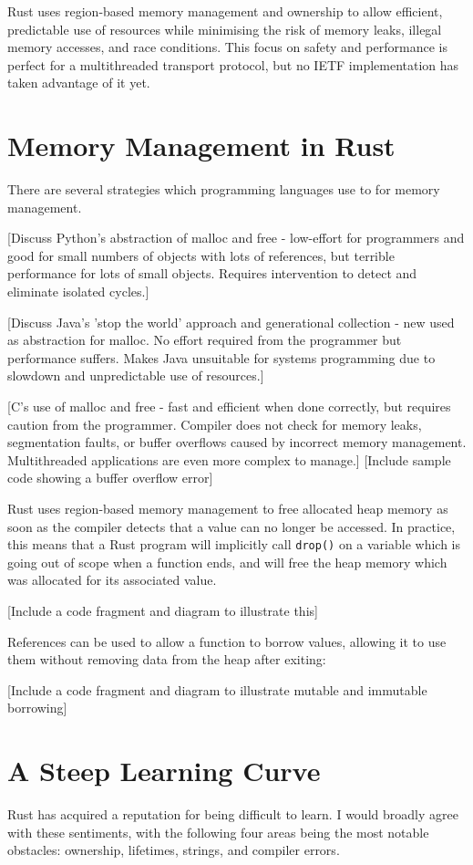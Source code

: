 \documentclass{l4proj}
\begin{document}
Rust uses region-based memory management and ownership to allow efficient, predictable use of resources while minimising the risk of memory leaks, illegal memory accesses, and race conditions. This focus on safety and performance is perfect for a multithreaded transport protocol, but no IETF implementation has taken advantage of it yet.

\section{Memory Management in Rust}
There are several strategies which programming languages use to for memory management.

[Discuss Python's abstraction of malloc and free - low-effort for programmers and good for small numbers of objects with lots of references, but terrible performance for lots of small objects. Requires intervention to detect and eliminate isolated cycles.]

[Discuss Java's 'stop the world' approach and generational collection - new used as abstraction for malloc. No effort required from the programmer but performance suffers. Makes Java unsuitable for systems programming due to slowdown and unpredictable use of resources.]

[C's use of malloc and free - fast and efficient when done correctly, but requires caution from the programmer. Compiler does not check for memory leaks, segmentation faults, or buffer overflows caused by incorrect memory management. Multithreaded applications are even more complex to manage.]
[Include sample code showing a buffer overflow error]

Rust uses region-based memory management to free allocated heap memory as soon as the compiler detects that a value can no longer be accessed. In practice, this means that a Rust program will implicitly call \texttt{drop()} on a variable which is going out of scope when a function ends, and will free the heap memory which was allocated for its associated value.

[Include a code fragment and diagram to illustrate this]

References can be used to allow a function to borrow values, allowing it to use them without removing data from the heap after exiting:

[Include a code fragment and diagram to illustrate mutable and immutable borrowing]


\section{A Steep Learning Curve}
Rust has acquired a reputation for being difficult to learn.\cite{rust-difficulty2}\cite{rust-difficulty3}\cite{rust-difficulty1} I would broadly agree with these sentiments, with the following four areas being the most notable obstacles: ownership, lifetimes, strings, and compiler errors.
\end{document}
